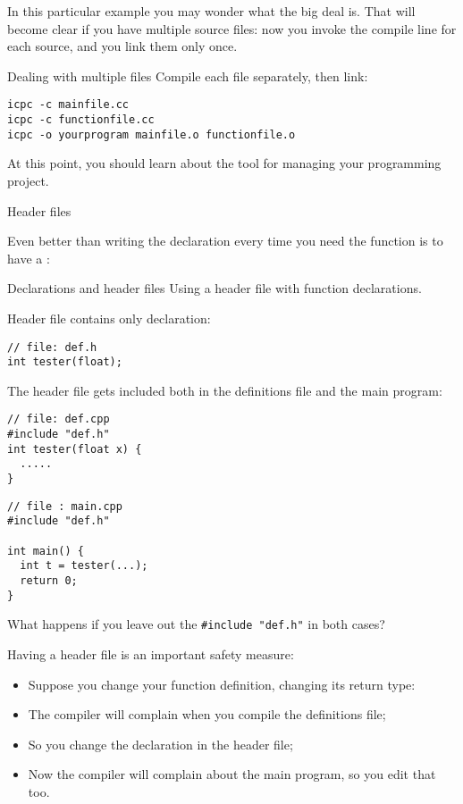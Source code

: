 In this particular example you may wonder what the big deal is.
That will become clear if you have multiple source files: now you
invoke the compile line for each source, and you link them only once.

\begin{block}{Dealing with multiple files}
  \label{sl:link-multiple}
  Compile each file separately, then link:
\begin{verbatim}
icpc -c mainfile.cc
icpc -c functionfile.cc
icpc -o yourprogram mainfile.o functionfile.o
\end{verbatim}  
\end{block}

At this point, you should learn about the  tool for
managing your programming project.

 {Header files}
\label{sec:headerfile}
\label{sec:hfile}

Even better than writing the declaration every time you need the
function is to have a :


\begin{block}{Declarations and header files}
  \label{sl:proto-header}
  Using a header file with function declarations.
  \begin{multicols}{2}
    Header file contains only declaration:
    \columnbreak
\begin{lstlisting}
// file: def.h
int tester(float);
\end{lstlisting}
\end{multicols}

The header file gets included both in the definitions file and the
main program:
\begin{multicols}{2}  
\begin{lstlisting}
// file: def.cpp
#include "def.h"
int tester(float x) {
  .....
}
\end{lstlisting}
\vfill\columnbreak
\begin{lstlisting}
// file : main.cpp
#include "def.h"

int main() {
  int t = tester(...);
  return 0;
}
\end{lstlisting}
\end{multicols}
What happens if you leave out the \lstinline$#include "def.h"$ in both cases?
\end{block}

Having a header file is an important safety measure:
\begin{itemize}
\item Suppose you change your function definition, changing its return
  type:
\item The compiler will complain when you compile the definitions
  file;
\item So you change the declaration in the header file;
\item Now the compiler will complain about the main program, so you
  edit that too.
\end{itemize}

